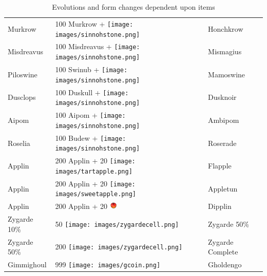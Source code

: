 \begin{table}
\begin{tabular}{lll}
    Murkrow & 100 Murkrow + \texttt{[image: images/sinnohstone.png]} & Honchkrow	\\
    Misdreavus & 100 Misdreavus + \texttt{[image: images/sinnohstone.png]} & Mismagius	\\
    Piloswine & 100 Swinub + \texttt{[image: images/sinnohstone.png]} & Mamoswine	\\
    Dusclops & 100 Duskull + \texttt{[image: images/sinnohstone.png]} & Dusknoir	\\
    Aipom & 100 Aipom + \texttt{[image: images/sinnohstone.png]} & Ambipom	\\
    Roselia & 100 Budew + \texttt{[image: images/sinnohstone.png]} & Roserade	\\
    Applin & 200 Applin + 20 \texttt{[image: images/tartapple.png]} & Flapple \\
    Applin & 200 Applin + 20 \texttt{[image: images/sweetapple.png]} & Appletun \\
    Applin & 200 Applin + 20 \includegraphics[width=1em,height=1em]{images/syrupyapple.png} & Dipplin \\
    Zygarde 10\% & 50 \texttt{[image: images/zygardecell.png]} & Zygarde 50\% \\
    Zygarde 50\% & 200 \texttt{[image: images/zygardecell.png]} & Zygarde Complete \\
    Gimmighoul & 999 \texttt{[image: images/gcoin.png]} & Gholdengo \\
  \end{tabular}
  \caption{Evolutions and form changes dependent upon items\label{table:itemevolutions}}
\end{table}

